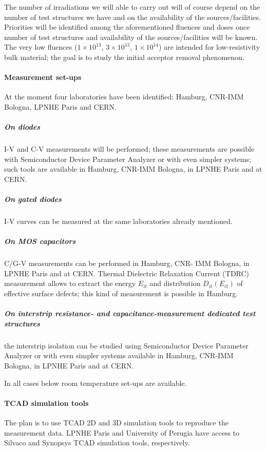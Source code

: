 \documentclass[dvips,12pt]{article}
\begin{document}
\noindent The number of irradiations we will able to carry out will of course depend on the 
number of test structures we have and on the availability of the sources/facilities. Priorities 
will be identified among the aforementioned fluences and doses once number of test structures 
and  availability of the sources/facilities will be known. 
\noindent The very low fluences ($1\times10^{13}$,  
$3\times10^{13}$, $1\times10^{14}$) are intended for low-resistivity bulk material; the goal 
is to study the initial acceptor removal phenomenon. 

\paragraph{Measurement set-ups} At the moment four laboratories have been identified: Hamburg, CNR-IMM Bologna, LPNHE Paris and CERN.

\subparagraph{On diodes} I-V and C-V measurements will be performed; these 
measurements are possible with Semiconductor Device Parameter Analyzer or 
with even simpler systems; such tools are available in Hamburg, CNR-IMM Bologna, in LPNHE Paris
and at CERN. 

\subparagraph{On gated diodes} I-V curves can be measured at the same laboratories
 already mentioned.

\subparagraph{On MOS capacitors}  C/G-V measurements can be performed in Hamburg, CNR-
IMM Bologna, in  LPNHE Paris and at CERN. Thermal Dielectric Relaxation Current (TDRC) 
measurement allows to extract the energy 
 $E_{it}$ and distribution  $D_{it}(E_{it})$ of effective surface defects; this kind of measurement 
 is possible in Hamburg.

\subparagraph{On  interstrip resistance- and capacitance-measurement dedicated test structures} 
the interstrip isolation  can be studied  using 
Semiconductor Device Parameter Analyzer or with even simpler systems available in Hamburg, CNR-IMM Bologna, in LPNHE Paris
and at CERN. 

\noindent In all cases below room temperature set-ups are available.

\paragraph{TCAD simulation tools}The plan is to use TCAD 2D and 3D simulation tools 
to reproduce the measurement data. LPNHE Paris and University of Perugia have access to 
Silvaco and Synopsys TCAD simulation tools, respectively. 
\end{document}
